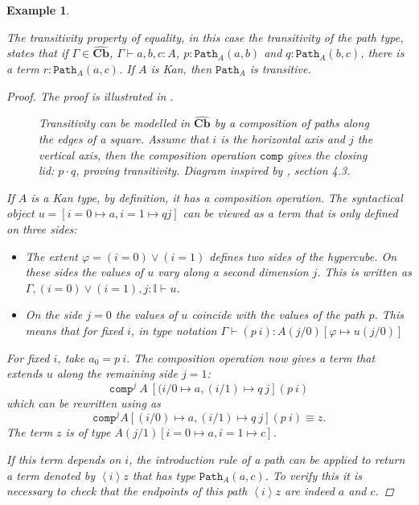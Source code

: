 \documentclass[12pt,a4paper,twoside,xetex]{book} %
\newcommand{\keyword}[1]{\emph{#1}\index{#1}}
\newtheorem{example}[theorem]{Example}
\newcommand{\psh}[1]{\widehat{#1}}
\newcommand{\op}[1]{\mathtt{#1}}
\newcommand{\cube}[0]{\textbf{Cb}}
\newcommand{\pa}[3]{\op{Path}_{#1}\left(#2, #3\right)}
\begin{document}
\begin{example}\label{pathtransitivity}

The \keyword{transitivity} property of equality, in this case the transitivity of the path type, 
states that if $\Gamma \in \psh{\cube}$, $\Gamma \vdash a,b,c : A$, $p: \op{Path}_A(a,b)$ and $q: 
\op{Path}_A(b,c)$, there is a term $r : \op{Path}_A(a,c)$. If $A$ is Kan, then 
$\op{Path}_A$ is transitive.	

\begin{proof}
The proof is illustrated in .

\begin{figure}\label{transdiag}

\caption{Transitivity can be modelled in $\psh{\cube}$ by a  composition 
of paths along the edges of a square. Assume that $i$ is the horizontal axis and   $j$ the vertical axis, then the composition operation $\texttt{comp}$ gives the closing lid: $p \cdot q$, proving transitivity. Diagram inspired by \cite{Cohen2016}, 
section 4.3.}
\end{figure}

If $A$ is a Kan type, by definition, it has a composition operation. The 
syntactical object $u = [i=0 \mapsto a, i=1 \mapsto q j]$ can be viewed as a 
term that is only defined on three sides:

\begin{itemize}
\item The extent $\varphi = (i=0) \vee (i=1)$ defines two sides of the 
hypercube. On these sides the values of $u$ vary along a second dimension $j$. 
This is written as $\Gamma, (i=0)\vee (i=1), j : \mathbb{I} \vdash u$.
\item On the side $j=0$ the values of $u$ coincide with the values of the path 
$p$. This means that for fixed $i$, in type notation $\Gamma \vdash (p \  i) : 
A(j/0)[\varphi \mapsto u(j/0)]$

\end{itemize}

For fixed $i$, take $a_0 = p \  i$. The composition operation now gives a 
term that extends $u$ along the remaining side $j=1$: $$\op{comp}^j\ A\ [(i/0 
\mapsto a, (i/1) \mapsto q\ j] (p\ i)$$ which can be rewritten using  
 as $$\op{comp}^j A [(i/0) \mapsto a, (i/1) \mapsto q \ j] 
(p \  i) \equiv z.$$ The term $z$ is of type $A(j/1)[i=0 \mapsto a, i=1 \mapsto 
c]$.

If this term depends on $i$, the introduction rule of a 
path can be applied to return a term denoted by $\left< i \right> z$ that has 
type $\pa{A}{a}{c}$. To verify this it is necessary to check that the endpoints 
of this path $\left< i \right> z$ are indeed $a$ and $c$.


\end{proof}
\end{example}
\end{document}

